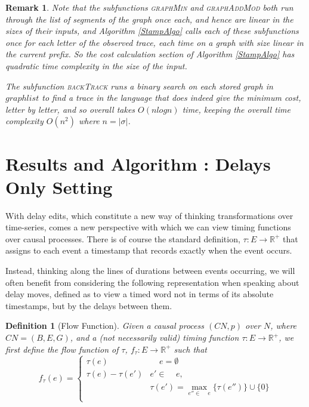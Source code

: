 \documentclass[conference]{IEEEtran}
\newcounter{cases}
\DeclareMathOperator*{\pre}{^\bullet}
\newtheorem{remark}{Remark}
\newtheorem{definition}{Definition}
\begin{document}
	\begin{remark} Note that the subfunctions \textsc{graphMin} and  \textsc{graphAddMod} both run through the list of segments of the graph once each, and hence are linear in the sizes of their inputs, and Algorithm \ref{StampAlgo} calls each of these subfunctions once for each letter of the observed trace, each time on a graph with size linear in the current prefix.  
		So the cost calculation section of Algorithm \ref{StampAlgo} has quadratic time complexity in the size of the input. 
		
		The subfunction \textsc{backTrack} runs a binary search on each stored graph in $graphlist$ to find a trace in the language that does indeed give the minimum cost, letter by letter, and so overall takes $O(nlogn)$ time, keeping the overall time complexity  $O(n^2)$ where $n = |\sigma|$.
	\end{remark}
	
	\section{Results and Algorithm : Delays Only Setting}
	With delay edits, which constitute a new way of thinking transformations over time-series, comes a new perspective with which we can view timing functions over causal processes. 
	There is of course the standard definition, $\tau : E \to \mathbb{R}^+$ that assigns to each event a timestamp that records exactly when the event occurs. 
	
	Instead, thinking along the lines of durations between events occurring, we will often benefit from considering the following representation when speaking about delay moves, defined as to view a timed word not in terms of its absolute timestamps, but by the delays between them. 
	
	\begin{definition}[Flow Function]
		Given a causal process $(CN, p)$ over $N$, where $CN = (B, E, G)$, and a (not necessarily valid) timing function $\tau : E \to \mathbb{R}^+$, we first define the \textit{flow} function of $\tau$, $f_{\tau} : E \to \mathbb{R}^+$ such that 
		$$f_{\tau}(e) = \begin{cases} 
			\tau(e) & \pre \pre e = \emptyset\\
			\tau(e) - \tau(e') &e' \in   \pre \pre e,\\ & \tau(e') = \max\limits_{e'' \in \pre \pre e} {\{\tau(e'')\} \cup \{0\}}\\
		\end{cases}
		$$
		
	\end{definition}
	
\end{document}
